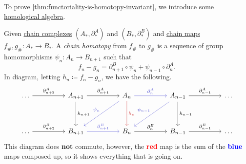 To prove \autoref{thm:functoriality-is-homotopy-invariant}, we introduce some \hyperref[sec:homological-algebra]{homological algebra}.

\begin{definition}\label{def:chain-homotopy}
	Given \hyperref[def:chain-complex]{chain complexes} \((A_\ast, \partial ^A_\ast)\) and \((B_\ast, \partial^B_\ast)\)
	and \hyperref[def:chain-map]{chain maps} \(f_\#, g_\# \colon  A_\ast \to B_\ast\). A \emph{chain homotopy} from
	\(f_\#\) to \(g_\#\) is a sequence of group homomorphisms \(\psi_n\colon A_n \to B_{n + 1}\) such that
	\[
		f_n - g_n = \partial ^B_{n + 1} \circ \psi_n + \psi_{n - 1} \circ \partial _n^A.
	\]
	In diagram, letting \(h_n \coloneqq f_n - g_n\), we have the following.
	\[
		\begin{tikzcd}
			\dots && {A_{n+1}} && {A_{n}} && {A_{n-1}} && \dots \\
			\\
			\dots && {B_{n+1}} && {B_{n}} && {B_{n-1}} && \dots
			\arrow["{\partial^A_{n-1}}", from=1-7, to=1-9]
			\arrow["{\partial^B_{n-1}}", from=3-7, to=3-9]
			\arrow["{\partial^A_{n}}", color={rgb,255:red,92;green,92;blue,214}, from=1-5, to=1-7]
			\arrow["{\partial^B_{n}}", from=3-5, to=3-7]
			\arrow["{\partial^B_{n+1}}", color={rgb,255:red,92;green,92;blue,214}, from=3-3, to=3-5]
			\arrow["{\partial^A_{n+2}}", from=1-1, to=1-3]
			\arrow["{\partial^B_{n+2}}", from=3-1, to=3-3]
			\arrow["{h_{n+1}}", from=1-3, to=3-3]
			\arrow["{h_{n}}", color={rgb,255:red,214;green,92;blue,92}, from=1-5, to=3-5]
			\arrow["{h_{n-1}}", from=1-7, to=3-7]
			\arrow["{\partial^A_{n+1}}", from=1-3, to=1-5]
			\arrow["{\psi_n}"', color={rgb,255:red,92;green,92;blue,214}, from=1-5, to=3-3]
			\arrow["{\psi_{n-1}}"', color={rgb,255:red,92;green,92;blue,214}, from=1-7, to=3-5]
		\end{tikzcd}
	\]
	This diagram does \textbf{not} commute, however, the \textbf{\textcolor{red}{red}} map is the sum of the
	\textbf{\textcolor{blue}{blue}} maps composed up, so it shows everything that is going on.
\end{definition}

